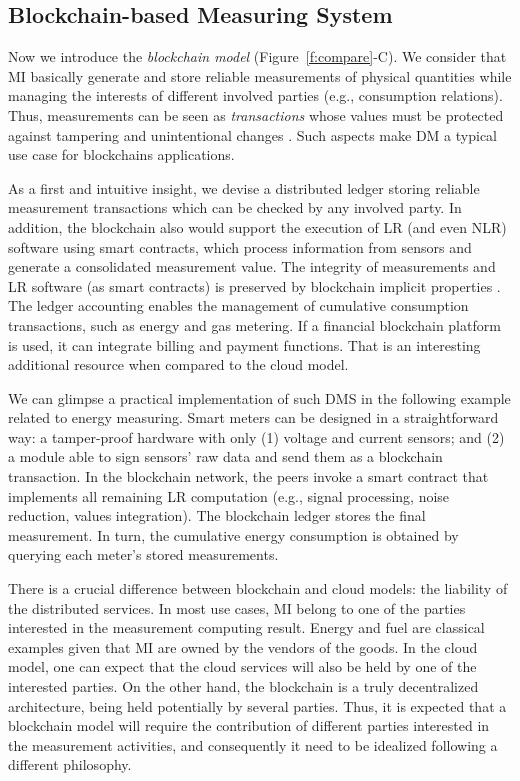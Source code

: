 \documentclass[journal]{IEEEtran}
\begin{document}
\subsection{Blockchain-based Measuring System}
\label{s:mi_blockchain}
Now we introduce the \emph{blockchain model} (Figure~\ref{f:compare}-C). 
We consider that MI basically generate and store reliable measurements of physical quantities while managing the interests of different involved parties (e.g., consumption relations). 
Thus, measurements can be seen as \emph{transactions} whose values must be protected against tampering and unintentional changes \cite{Esche2015}. Such aspects make DM a typical use case for blockchains applications. 

As a first and intuitive insight, we devise a distributed ledger storing reliable measurement transactions which can be checked by any involved party. 
In addition, the blockchain also would support the execution of LR (and even NLR) software using smart contracts, which process information from sensors and generate a consolidated measurement value. 
The integrity of measurements and LR software (as smart contracts) is preserved by blockchain implicit properties \cite{Zheng2017}. 
The ledger accounting enables the management of cumulative consumption transactions, such as energy and gas metering. If a financial blockchain platform is used, it can integrate billing and payment functions. 
That is an interesting additional resource when compared to the cloud model.

We can glimpse a practical implementation of such DMS in the following example related to energy measuring. 
Smart meters can be designed in a straightforward way: a tamper-proof hardware with only (1) voltage and current sensors; and (2) a module able to sign sensors' raw data and send them as a blockchain transaction. 
In the blockchain network, the peers invoke a smart contract that implements all remaining LR computation (e.g., signal processing, noise reduction, values integration). 
The blockchain ledger stores the final measurement. 
In turn, the cumulative energy consumption is obtained by querying each meter's stored measurements.

There is a crucial difference between blockchain and cloud models: the liability of the distributed services. 
In most use cases, MI belong to one of the parties interested in the measurement computing result. 
Energy and fuel are classical examples given that MI are owned by the vendors of the goods.
In the cloud model, one can expect that the cloud services will also be held by one of the interested parties. 
On the other hand, the blockchain is a truly decentralized architecture, being held potentially by several parties. 
Thus, it is expected that a blockchain model will require the contribution of different parties interested in the measurement activities, and consequently it need to be idealized following a different philosophy.
\end{document}
